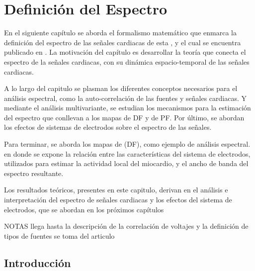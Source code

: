 \chapter{Definición  del Espectro}

\begin{resumen}

En el siguiente capítulo se aborda el formalismo matemático que enmarca la definición del espectro de las señales cardiacas de esta \nombreDoc, y el cual se encuentra publicado en \cite{Requena13b}. La motivación del capítulo es desarrollar la teoría que conecta el espectro de la señales cardiacas, con su dinámica espacio-temporal de las señales cardiacas.

A lo largo del capitulo se plasman los diferentes conceptos necesarios para el análisis espectral, como la auto-correlación de las fuentes y señales cardiacas. Y mediante el análisis multivariante, se estudian los mecanismos para la estimación del espectro que conllevan a los mapas de \acf{DF} y de \acf{PF}. Por último, se abordan los efectos de sistemas de electrodos sobre el espectro de las señales.


Para terminar, se aborda los mapas de (\ac{DF}), como ejemplo de análisis espectral. en donde se expone la relación entre las características del sistema de electrodos, utilizados para estimar la actividad local del miocardio, y el ancho de banda del espectro resultante.

Los resultados teóricos, presentes en este capitulo, derivan en el análisis e
interpretación del espectro de señales cardiacas y los efectos del sistema
de electrodos, que se abordan en los próximos capítulos

NOTAS llega hasta la descripción de la correlación de voltajes  y la definición de tipos de fuentes se toma del articulo


\end{resumen}


\section{Introducción}

